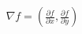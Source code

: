 \documentclass[preview]{standalone}
\begin{document}
\begin{align*}
\nabla f = \left( \frac{\partial f}{\partial x}, \frac{\partial f}{\partial y} \right)
\end{align*}
\end{document}
